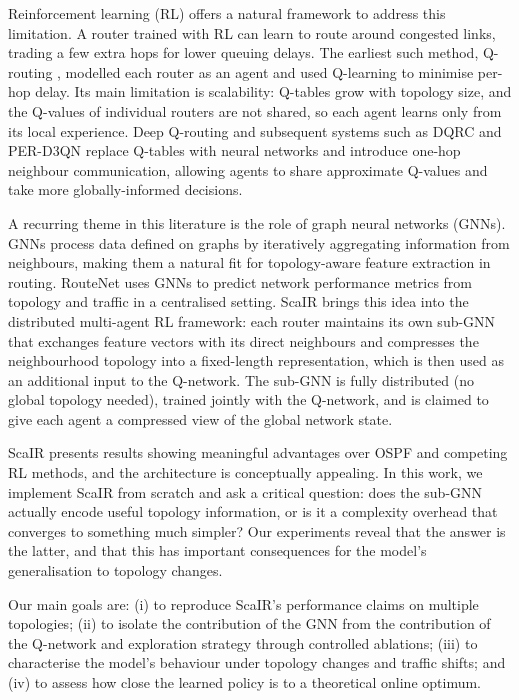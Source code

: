 \documentclass[10pt,twocolumn,letterpaper]{article}
\begin{document}
Reinforcement learning (RL) offers a natural framework to address this
limitation. A router trained with RL can learn to route around
congested links, trading a few extra hops for lower queuing delays. The
earliest such method, Q-routing \cite{boyan1994}, modelled each router
as an agent and used Q-learning to minimise per-hop delay. Its main
limitation is scalability: Q-tables grow with topology size, and the
Q-values of individual routers are not shared, so each agent learns only
from its local experience. Deep Q-routing \cite{mukhutdinov2019} and
subsequent systems such as DQRC \cite{you2020} and PER-D3QN
\cite{bai2024} replace Q-tables with neural networks and introduce
one-hop neighbour communication, allowing agents to share approximate
Q-values and take more globally-informed decisions.

A recurring theme in this literature is the role of graph neural networks
(GNNs). GNNs process data defined on graphs by iteratively aggregating
information from neighbours, making them a natural fit for topology-aware
feature extraction in routing. RouteNet \cite{rusek2020} uses GNNs to
predict network performance metrics from topology and traffic in a
centralised setting. ScaIR \cite{scair2025} brings this idea into the
distributed multi-agent RL framework: each router maintains its own
sub-GNN that exchanges feature vectors with its direct neighbours and
compresses the neighbourhood topology into a fixed-length representation,
which is then used as an additional input to the Q-network. The
sub-GNN is fully distributed (no global topology needed), trained
jointly with the Q-network, and is claimed to give each agent a
compressed view of the global network state.

ScaIR presents results showing meaningful advantages over OSPF and
competing RL methods, and the architecture is conceptually appealing.
In this work, we implement ScaIR from scratch and ask a critical
question: does the sub-GNN actually encode useful topology information,
or is it a complexity overhead that converges to something much simpler?
Our experiments reveal that the answer is the latter, and that this has
important consequences for the model's generalisation to topology
changes.

Our main goals are: (i) to reproduce ScaIR's performance claims on
multiple topologies; (ii) to isolate the contribution of the GNN from
the contribution of the Q-network and exploration strategy through
controlled ablations; (iii) to characterise the model's behaviour under
topology changes and traffic shifts; and (iv) to assess how close the
learned policy is to a theoretical online optimum.
\end{document}
